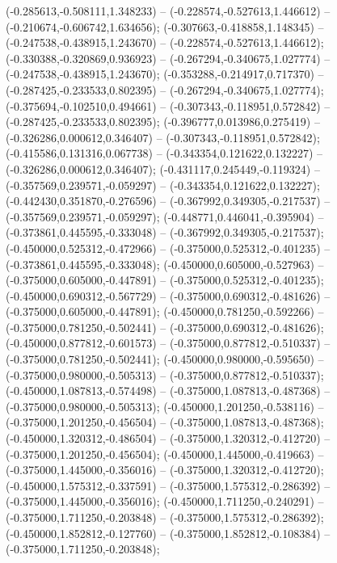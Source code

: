  (-0.285613,-0.508111,1.348233) -- (-0.228574,-0.527613,1.446612) -- (-0.210674,-0.606742,1.634656);
 (-0.307663,-0.418858,1.148345) -- (-0.247538,-0.438915,1.243670) -- (-0.228574,-0.527613,1.446612);
 (-0.330388,-0.320869,0.936923) -- (-0.267294,-0.340675,1.027774) -- (-0.247538,-0.438915,1.243670);
 (-0.353288,-0.214917,0.717370) -- (-0.287425,-0.233533,0.802395) -- (-0.267294,-0.340675,1.027774);
 (-0.375694,-0.102510,0.494661) -- (-0.307343,-0.118951,0.572842) -- (-0.287425,-0.233533,0.802395);
 (-0.396777,0.013986,0.275419) -- (-0.326286,0.000612,0.346407) -- (-0.307343,-0.118951,0.572842);
 (-0.415586,0.131316,0.067738) -- (-0.343354,0.121622,0.132227) -- (-0.326286,0.000612,0.346407);
 (-0.431117,0.245449,-0.119324) -- (-0.357569,0.239571,-0.059297) -- (-0.343354,0.121622,0.132227);
 (-0.442430,0.351870,-0.276596) -- (-0.367992,0.349305,-0.217537) -- (-0.357569,0.239571,-0.059297);
 (-0.448771,0.446041,-0.395904) -- (-0.373861,0.445595,-0.333048) -- (-0.367992,0.349305,-0.217537);
 (-0.450000,0.525312,-0.472966) -- (-0.375000,0.525312,-0.401235) -- (-0.373861,0.445595,-0.333048);
 (-0.450000,0.605000,-0.527963) -- (-0.375000,0.605000,-0.447891) -- (-0.375000,0.525312,-0.401235);
 (-0.450000,0.690312,-0.567729) -- (-0.375000,0.690312,-0.481626) -- (-0.375000,0.605000,-0.447891);
 (-0.450000,0.781250,-0.592266) -- (-0.375000,0.781250,-0.502441) -- (-0.375000,0.690312,-0.481626);
 (-0.450000,0.877812,-0.601573) -- (-0.375000,0.877812,-0.510337) -- (-0.375000,0.781250,-0.502441);
 (-0.450000,0.980000,-0.595650) -- (-0.375000,0.980000,-0.505313) -- (-0.375000,0.877812,-0.510337);
 (-0.450000,1.087813,-0.574498) -- (-0.375000,1.087813,-0.487368) -- (-0.375000,0.980000,-0.505313);
 (-0.450000,1.201250,-0.538116) -- (-0.375000,1.201250,-0.456504) -- (-0.375000,1.087813,-0.487368);
 (-0.450000,1.320312,-0.486504) -- (-0.375000,1.320312,-0.412720) -- (-0.375000,1.201250,-0.456504);
 (-0.450000,1.445000,-0.419663) -- (-0.375000,1.445000,-0.356016) -- (-0.375000,1.320312,-0.412720);
 (-0.450000,1.575312,-0.337591) -- (-0.375000,1.575312,-0.286392) -- (-0.375000,1.445000,-0.356016);
 (-0.450000,1.711250,-0.240291) -- (-0.375000,1.711250,-0.203848) -- (-0.375000,1.575312,-0.286392);
 (-0.450000,1.852812,-0.127760) -- (-0.375000,1.852812,-0.108384) -- (-0.375000,1.711250,-0.203848);
